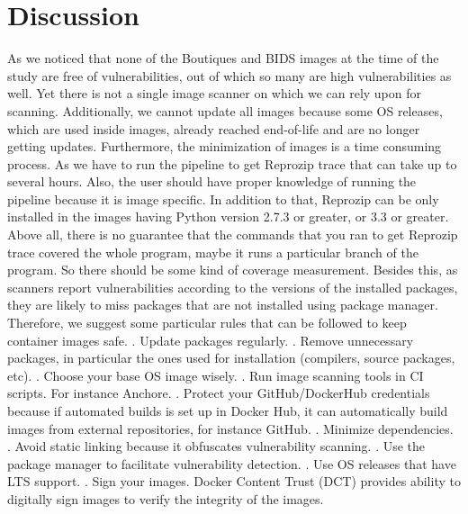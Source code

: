 \documentclass[a4paper,num-refs]{oup-contemporary}
\begin{document}
\section{Discussion}

As we noticed that none of the Boutiques and BIDS images at the time of the study are free of vulnerabilities, out of which
so many are high vulnerabilities as well. Yet there is not a single image scanner on which we can rely upon for
scanning. Additionally, we cannot update all images because some OS releases, which are used inside images, 
already reached end-of-life and are
no longer getting updates. Furthermore, the minimization of images is a time consuming process. As we have to run
the pipeline to get Reprozip trace that can take up to several hours. Also, the user should have proper knowledge
of running the pipeline because it is image specific. In addition to that, Reprozip can be only installed
in the images having Python version 2.7.3 or greater, or 3.3 or greater. Above all, there is no guarantee that
the commands that you ran to get Reprozip trace covered the whole program, maybe it runs a particular
branch of the program. So there should be some kind of coverage measurement.
Besides this, as scanners report vulnerabilities according to the versions of the installed packages,
they are likely to miss packages that are not installed using package manager. 
Therefore, we suggest some particular rules that can be
followed to keep container images safe.
. Update packages regularly.
. Remove unnecessary packages, in particular the ones used for installation (compilers, source packages, etc).
. Choose your base OS image wisely.
. Run image scanning tools in CI scripts. For instance Anchore.
. Protect your GitHub/DockerHub credentials because if automated builds is set up
in Docker Hub, it can automatically build images from external repositories, for instance GitHub.
. Minimize dependencies.
. Avoid static linking because it obfuscates vulnerability scanning.
. Use the package manager to facilitate vulnerability detection.
. Use OS releases that have LTS support.
. Sign your images. Docker Content Trust (DCT) provides ability to digitally sign
images to verify the integrity of the images.
\vspace*{-2mm}
\end{document}
